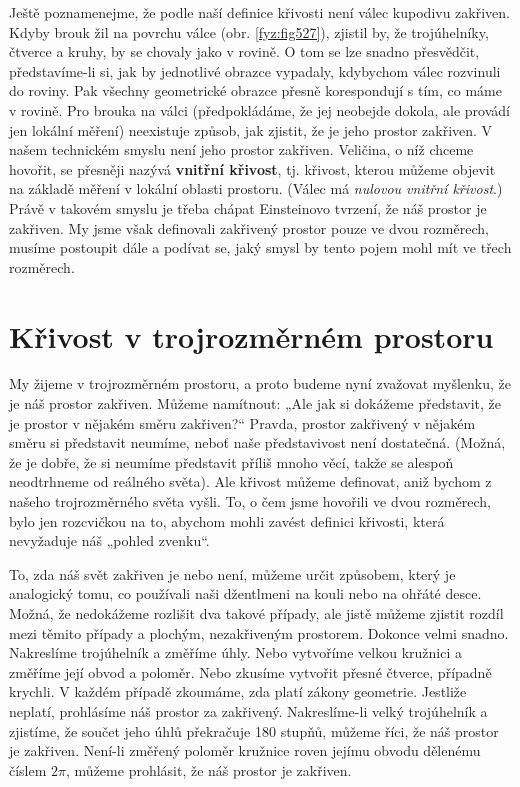 {    Ještě poznamenejme, že podle naší definice křivosti není válec kupodivu zakřiven. Kdyby brouk 
    žil na povrchu válce (obr. \ref{fyz:fig527}), zjistil by, že trojúhelníky, čtverce a kruhy, by 
    se chovaly jako v rovině. O tom se lze snadno přesvědčit, představíme-li si, jak by jednotlivé 
    obrazce vypadaly, kdybychom válec rozvinuli do roviny. Pak všechny geometrické obrazce přesně 
    korespondují s tím, co máme v rovině. Pro brouka na válci (předpokládáme, že jej neobejde 
    dokola, ale provádí jen lokální měření) neexistuje způsob, jak zjistit, že je jeho prostor 
    zakřiven. V našem technickém smyslu není jeho prostor zakřiven. Veličina, o níž chceme hovořit, 
    se přesněji nazývá \textbf{vnitřní křivost}, tj. křivost, kterou můžeme objevit na základě 
    měření v lokální oblasti prostoru. (Válec má \emph{nulovou vnitřní křivost}.) Právě v takovém 
    smyslu je třeba chápat Einsteinovo tvrzení, že náš prostor je zakřiven. My jsme však definovali 
    zakřivený prostor pouze ve dvou rozměrech, musíme postoupit dále a podívat se, jaký smysl by 
    tento pojem mohl mít ve třech rozměrech.
    
  \section{Křivost v trojrozměrném prostoru}\label{fyz:IIchapXLIIsecII}
    My žijeme v trojrozměrném prostoru, a proto budeme nyní zvažovat myšlenku, že je náš prostor 
    zakřiven. Můžeme namítnout: „Ale jak si dokážeme představit, že je prostor v nějakém směru 
    zakřiven?“ Pravda, prostor zakřivený v nějakém směru si představit neumíme, neboť naše 
    představivost není dostatečná. (Možná, že je dobře, že si neumíme představit příliš mnoho věcí, 
    takže se alespoň neodtrhneme od reálného světa). Ale křivost můžeme definovat, aniž bychom z 
    našeho trojrozměrného světa vyšli. To, o čem jsme hovořili ve dvou rozměrech, bylo jen 
    rozcvičkou na to, abychom mohli zavést definici křivosti, která nevyžaduje náš „pohled zvenku“.
    
    To, zda náš svět zakřiven je nebo není, můžeme určit způsobem, který je analogický tomu, co 
    používali naši džentlmeni na kouli nebo na ohřáté desce. Možná, že nedokážeme rozlišit dva 
    takové případy, ale jistě můžeme zjistit rozdíl mezi těmito případy a plochým, nezakřiveným 
    prostorem. Dokonce velmi snadno. Nakreslíme trojúhelník a změříme úhly. Nebo vytvoříme velkou 
    kružnici a změříme její obvod a poloměr. Nebo zkusíme vytvořit přesné čtverce, případně 
    krychli. V každém případě zkoumáme, zda platí zákony geometrie. Jestliže neplatí, prohlásíme 
    náš prostor za zakřivený. Nakreslíme-li velký trojúhelník a zjistíme, že součet jeho úhlů 
    překračuje \num{180} stupňů, můžeme říci, že náš prostor je zakřiven. Není-li změřený poloměr 
    kružnice roven jejímu obvodu dělenému číslem \(2\pi\), můžeme prohlásit, že náš prostor je 
    zakřiven.
    
}

